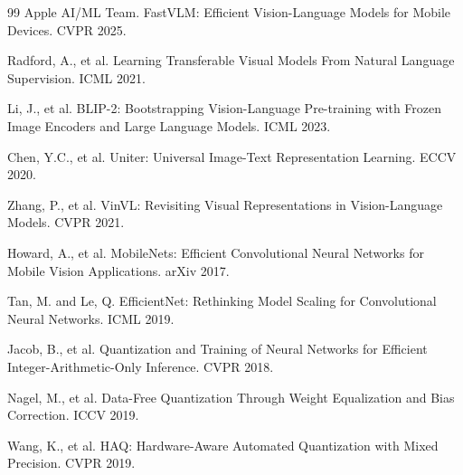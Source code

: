 \documentclass{article}
\begin{document}
\begin{thebibliography}{99}
 Apple AI/ML Team. FastVLM: Efficient Vision-Language Models for Mobile Devices. CVPR 2025.

 Radford, A., et al. Learning Transferable Visual Models From Natural Language Supervision. ICML 2021.

 Li, J., et al. BLIP-2: Bootstrapping Vision-Language Pre-training with Frozen Image Encoders and Large Language Models. ICML 2023.

 Chen, Y.C., et al. Uniter: Universal Image-Text Representation Learning. ECCV 2020.

 Zhang, P., et al. VinVL: Revisiting Visual Representations in Vision-Language Models. CVPR 2021.

 Howard, A., et al. MobileNets: Efficient Convolutional Neural Networks for Mobile Vision Applications. arXiv 2017.

 Tan, M. and Le, Q. EfficientNet: Rethinking Model Scaling for Convolutional Neural Networks. ICML 2019.

 Jacob, B., et al. Quantization and Training of Neural Networks for Efficient Integer-Arithmetic-Only Inference. CVPR 2018.

 Nagel, M., et al. Data-Free Quantization Through Weight Equalization and Bias Correction. ICCV 2019.

 Wang, K., et al. HAQ: Hardware-Aware Automated Quantization with Mixed Precision. CVPR 2019.

\end{thebibliography}
\end{document}
